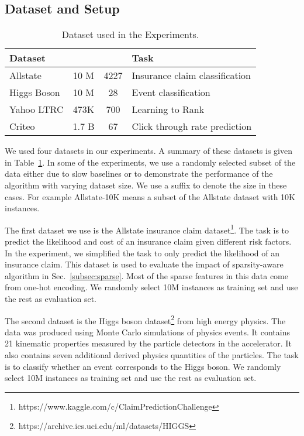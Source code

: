 \documentclass{sig-alternate-05-2015}
\begin{document}
\subsection{Dataset and Setup}\label{subsec:dataset}

\begin{table}
\centering
\caption{Dataset used in the Experiments.}\label{tbl:dataset}
\begin{tabular}{|l|c|c|l|}\hline
  Dataset &  &   & Task  \\ \hline
  Allstate  & 10 M & 4227  & Insurance claim classification \\\hline
  Higgs Boson        & 10 M & 28    & Event classification \\ \hline
  Yahoo LTRC   & 473K & 700  &  Learning to Rank\\\hline
  Criteo       & 1.7 B  & 67   &   Click through rate prediction\\\hline
\end{tabular}
\end{table}
We used four datasets in our experiments. A summary of these datasets is given in Table~\ref{tbl:dataset}.
In some of the experiments, we use a randomly selected subset of the data either due to slow baselines or to demonstrate the performance of the algorithm with varying dataset size.
We use a suffix to denote the size in these cases. For example
Allstate-10K means a subset of the Allstate dataset with 10K instances.

The first dataset we use is the Allstate insurance claim dataset\footnote{https://www.kaggle.com/c/ClaimPredictionChallenge}.
The task is to predict the likelihood and cost of an insurance claim given different risk factors.
In the experiment, we simplified the task to only predict the likelihood of an insurance claim.
This dataset is used to evaluate the impact of sparsity-aware algorithm in Sec.~\ref{subsec:sparse}.
Most of the sparse features in this data come from one-hot encoding.
We randomly select 10M instances as training set and use the rest as evaluation set.

The second dataset is the Higgs boson dataset\footnote{https://archive.ics.uci.edu/ml/datasets/HIGGS} from high energy physics.
The data was produced using Monte Carlo simulations of physics events.
It contains 21 kinematic properties measured by the particle detectors in the accelerator.
It also contains seven additional derived physics quantities of the particles.
The task is to classify whether an event corresponds to the Higgs boson.
We randomly select 10M instances as training set and use the rest as evaluation set.
\end{document}
